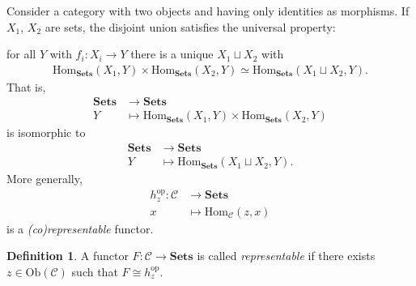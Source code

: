\documentclass[12pt]{report}
\theoremstyle{plain}
\theoremstyle{remark}
\theoremstyle{definition}
\newtheorem{definition}[theorem]{Definition}
\newcommand{\Hom}[3]{\mathrm{Hom}_{#3}(#1,#2)}
\begin{document}
Consider a category with two objects and having only identities as morphisms. If $X_1$, $X_2$ are sets, the disjoint union satisfies the universal property:
\begin{figure}[H]
\centering
{}
\end{figure}
\noindent for all $Y$ with $f_i:X_i\rightarrow Y$ there is a unique $X_1\sqcup X_2$ with
\begin{align*}
    \Hom{X_1}{Y}{\mathbf{Sets}} \times \Hom{X_2}{Y}{\mathbf{Sets}} \simeq \Hom{X_1\sqcup X_2}{Y}{\mathbf{Sets}}.
\end{align*}
That is,
\begin{align*}
    \mathbf{Sets}&\rightarrow \mathbf{Sets} \\
    Y &\mapsto \Hom{X_1}{Y}{\mathbf{Sets}} \times \Hom{X_2}{Y}{\mathbf{Sets}}
\end{align*}
is isomorphic to
\begin{align*}
    \mathbf{Sets} &\rightarrow \mathbf{Sets} \\
    Y &\mapsto \Hom{X_1\sqcup X_2}{Y}{\mathbf{Sets}}.
\end{align*}
More generally,
\begin{align*}
    h_z^\mathrm{op}:\mathcal{C} &\rightarrow\mathbf{Sets} \\
    x &\mapsto \Hom{z}{x}{\mathcal{C}}
\end{align*}
is a \emph{(co)representable} functor.

\begin{definition}
    A functor $F:\mathcal{C} \rightarrow \mathbf{Sets}$ is called \emph{representable} if there exists $z\in\mathrm{Ob}(\mathcal{C})$ such that $F\cong h_z^\mathrm{op}$.
\end{definition}
\end{document}
